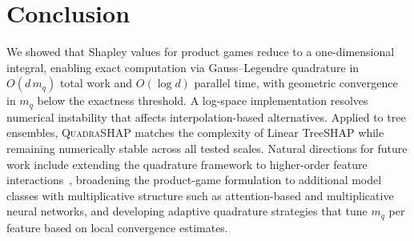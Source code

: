 \documentclass{article}
\begin{document}
\section{Conclusion}

We showed that Shapley values for product games reduce to a one-dimensional integral, enabling exact computation via Gauss--Legendre quadrature in $O(d\,m_q)$ total work and $O(\log d)$ parallel time, with geometric convergence in $m_q$ below the exactness threshold. A log-space implementation resolves numerical instability that affects interpolation-based alternatives. Applied to tree ensembles, \textsc{QuadraSHAP} matches the complexity of Linear TreeSHAP while remaining numerically stable across all tested scales. Natural directions for future work include extending the quadrature framework to higher-order feature interactions~\citep{shapiq}, broadening the product-game formulation to additional model classes with multiplicative structure such as attention-based and multiplicative neural networks, and developing adaptive quadrature strategies that tune $m_q$ per feature based on local convergence estimates.




\appendix








\end{document}
